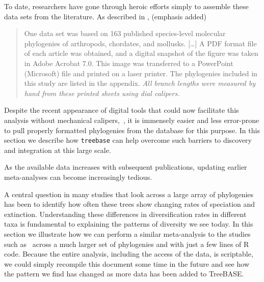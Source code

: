 \documentclass[authoryear, preprint]{elsarticle}
\begin{document}
To date, researchers have gone through heroic efforts simply to assemble these data sets from the literature.  
As described in \citet{McPeek2007}, (emphasis added)
\begin{quote}
One data set was based on 163 published species-level molecular phylogenies of arthropods, chordates, and mollusks. [\dots] A PDF format file of each article was obtained, and a digital snapshot of the figure was taken in Adobe Acrobat 7.0. This image was transferred to a PowerPoint (Microsoft) file and printed on a laser printer. The phylogenies included in this study are listed in the appendix. \emph{All branch lengths were measured by hand from these  printed sheets using dial calipers.}
\end{quote}
Despite the recent appearance of digital tools that could now facilitate this analysis without mechanical calipers,~\citep[\emph{e.g.}][]{Laubach2007},
it is immensely easier and less error-prone to pull properly formatted phylogenies from the database for this purpose. 
In this section we describe how \texttt{treebase} can help overcome such barriers to discovery and integration at this large scale.   

As the available data increases with subsequent publications, updating earlier meta-analyses 
can become increasingly tedious. 



A central question in many studies that look across a large array of phylogenies
has been to identify how often these trees show changing rates of speciation and extinction.
Understanding these differences in diversification rates in different taxa is fundamental 
to explaining the patterns of diversity we see today.  
In this section we illustrate how we can perform a similar meta-analysis to the studies 
such as~\citet[\emph{e.g.}][]{McPeek2007, Phillimore2008, McPeek2008,Quental2010, Davies2011a} 
across a much larger set of phylogenies and with just a few lines of R code.   
Because the entire analysis, including the access of the data, is scriptable,
we could simply recompile this document some time in the future and see how the pattern we find has changed
as more data has been added to TreeBASE.  
\end{document}
